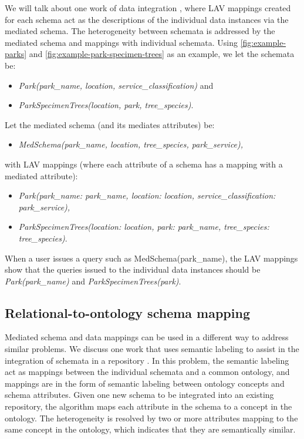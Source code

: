 We will talk about one work of data integration \cite{Levy1996Querying}, where LAV mappings created for each schema act as the descriptions of the individual data instances via the mediated schema. The heterogeneity between schemata is addressed by the mediated schema and mappings with individual schemata. Using \autoref{fig:example-parks} and \autoref{fig:example-park-specimen-trees} as an example, we let the schemata be:
\begin{itemize}
	\item[] \textit{Park(park\_name, location, service\_classification)} and
	\item[] \textit{ParkSpecimenTrees(location, park, tree\_species)}.
\end{itemize}
Let the mediated schema (and its mediates attributes) be:
\begin{itemize}
	\item[] \textit{MedSchema(park\_name, location, tree\_species, park\_service),}
\end{itemize}
with LAV mappings (where each attribute of a schema has a mapping with a mediated attribute):
\begin{itemize}
	\item[] \textit{Park(park\_name: park\_name, location: location, service\_classification: park\_service),}
	\item[] \textit{ParkSpecimenTrees(location: location, park: park\_name, tree\_species: tree\_species)}.
\end{itemize}
When a user issues a query such as MedSchema(park\_name), the LAV mappings show that the queries issued to the individual data instances should be \textit{Park(park\_name)} and \textit{ParkSpecimenTrees(park)}.

\subsection{Relational-to-ontology schema mapping}

Mediated schema and data mappings can be used in a different way to address similar problems. We discuss one work that uses semantic labeling to assist in the integration of schemata in a repository \cite{Diego2018Machine}. In this problem, the semantic labeling act as mappings between the individual schemata and a common ontology, and mappings are in the form of semantic labeling between ontology concepts and schema attributes. Given one new schema to be integrated into an existing repository, the algorithm maps each attribute in the schema to a concept in the ontology. The heterogeneity is resolved by two or more attributes mapping to the same concept in the ontology, which indicates that they are semantically similar.

